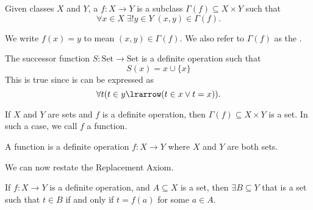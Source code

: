 \documentclass[notoc,notitlepage]{tufte-book}
\begin{document}
\begin{defn}
\label{defn:definite_operation}
  Given classes $X$ and $Y$, a  $f: X \to Y$ is a subclass $\Gamma(f) \subseteq X \times Y$ such that
  \begin{equation*}
    \forall x \in X \; \exists ! y \in Y \; (x, y) \in \Gamma(f).
  \end{equation*}
\end{defn}

\begin{note}
  We write $f(x) = y$ to mean $(x, y) \in \Gamma(f)$. We also refer to $\Gamma(f)$ as the .
\end{note}

\begin{eg}
  The successor function $S : \text{Set} \to \text{Set}$ is a definite operation such that
  \begin{equation*}
    S(x) = x \cup \{x\}
  \end{equation*}
  This is true since is can be expressed as
  \begin{equation*}
    \forall t ( t \in y \lrarrow ( t \in x \lor t = x ) ).
  \end{equation*}
\end{eg}

\begin{note}
  If $X$ and $Y$ are sets and $f$ is a definite operation, then $\Gamma(f) \subseteq X \times Y$ is a set. In such a case, we call $f$ a function.
\end{note}

\begin{defn}[Functions]
\label{defn:functions}
  A function is a definite operation $f : X \to Y$ where $X$ and $Y$ are both sets.
\end{defn}

We can now restate the Replacement Axiom.

\begin{axiom}
\label{axiom:replacement_axiom_restated}
  If $f : X \to Y$ is a definite operation, and $A \subseteq X$ is a set, then $\exists B \subseteq Y$ that is a set such that $t \in B$ if and only if $t = f(a)$ for some $a \in A$.
\end{axiom}

\end{document}
